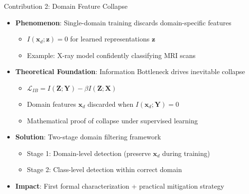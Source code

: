 \documentclass[aspectratio=169]{beamer}
\begin{document}
\begin{frame}{Contribution 2: Domain Feature Collapse}
\begin{itemize}
    \item \textbf{Phenomenon}: Single-domain training discards domain-specific features
    \begin{itemize}
        \item $I(\mathbf{x}_d; \mathbf{z}) = 0$ for learned representations $\mathbf{z}$
        \item Example: X-ray model confidently classifying MRI scans
    \end{itemize}
    \item \textbf{Theoretical Foundation}: Information Bottleneck drives inevitable collapse
    \begin{itemize}
        \item $\mathcal{L}_{IB} = I(\mathbf{Z}; \mathbf{Y}) - \beta I(\mathbf{Z}; \mathbf{X})$
        \item Domain features $\mathbf{x}_d$ discarded when $I(\mathbf{x}_d; \mathbf{Y}) = 0$
        \item Mathematical proof of collapse under supervised learning
    \end{itemize}
    \item \textbf{Solution}: Two-stage domain filtering framework
    \begin{itemize}
        \item Stage 1: Domain-level detection (preserve $\mathbf{x}_d$ during training)
        \item Stage 2: Class-level detection within correct domain
    \end{itemize}
    \item \textbf{Impact}: First formal characterization + practical mitigation strategy
\end{itemize}
\end{frame}
\end{document}
